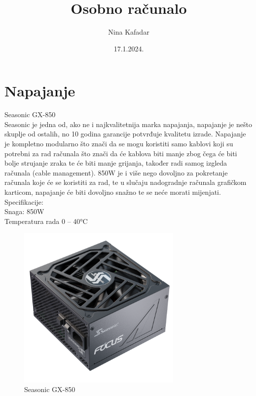 \documentclass{report}
\begin{document}
\title{Osobno računalo}
\author{Nina Kafadar}
\date{17.1.2024.}
\maketitle
\tableofcontents
\listoffigures

 
\chapter{Napajanje}
Seasonic GX-850
\\ Seasonic je jedna od, ako ne i najkvalitetnija marka napajanja, napajanje je nešto skuplje od ostalih, no 10 godina garancije potvrđuje kvalitetu izrade. Napajanje je kompletno modularno što znači da se mogu koristiti samo kablovi koji su potrebni za rad računala što znači da će kablova biti manje zbog čega će biti bolje strujanje zraka te će biti manje grijanja, također radi samog izgleda računala (cable management). 850W je i više nego dovoljno za pokretanje računala koje će se koristiti za rad, te u slučaju nadogradnje računala grafičkom karticom, napajanje će biti dovoljno snažno te se neće morati mijenjati.
\\Specifikacije: 
\\Snaga: 850W
\\Temperatura rada 0 – 40°C
\begin{figure}[h]
\includegraphics[width=8cm]{Napajanje.png}
\caption{Seasonic GX-850}
\end{figure}
\end{document}

